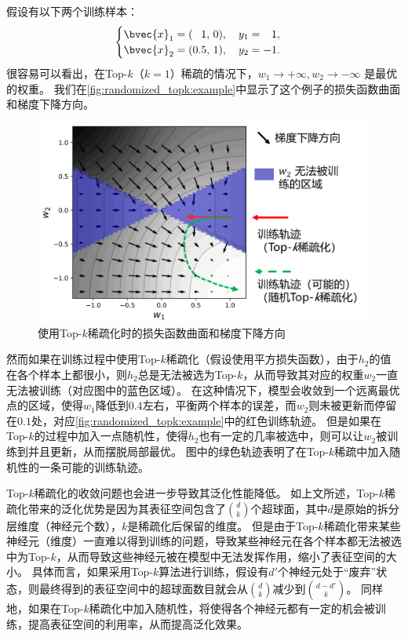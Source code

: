 假设有以下两个训练样本：
\begin{equation}
\begin{cases}
    \bvec{x}_1 = (\phantom{0.}1, \, 0), \quad y_1 = \phantom{-}1, \\
    \bvec{x}_2 = (          0.5, \, 1), \quad y_2 = -1.
\end{cases}
\end{equation}
%
很容易可以看出，在Top-$k$（$k=1$）稀疏的情况下，$w_1 \to +\infty, w_2 \to -\infty$ 是最优的权重。
%
我们在\autoref{fig:randomized_topk:example}中显示了这个例子的损失函数曲面和梯度下降方向。


\begin{figure}[htbp]
    \centering
    \includegraphics[width=0.75\linewidth]{Z_Resources/randtopk_example.png}
    \caption{使用Top-$k$稀疏化时的损失函数曲面和梯度下降方向}
    \label{fig:randomized_topk:example}
\end{figure}



然而如果在训练过程中使用Top-$k$稀疏化（假设使用平方损失函数），由于$h_2$的值在各个样本上都很小，则$h_2$总是无法被选为Top-$k$，从而导致其对应的权重$w_2$一直无法被训练（对应图中的蓝色区域）。
%
在这种情况下，模型会收敛到一个远离最优点的区域，使得$w_1$降低到$0.4$左右，平衡两个样本的误差，而$w_2$则未被更新而停留在$0.1$处，对应\autoref{fig:randomized_topk:example}中的红色训练轨迹。
%
但是如果在Top-$k$的过程中加入一点随机性，使得$h_2$也有一定的几率被选中，则可以让$w_2$被训练到并且更新，从而摆脱局部最优。
图中的绿色轨迹表明了在Top-$k$稀疏中加入随机性的一条可能的训练轨迹。


Top-$k$稀疏化的收敛问题也会进一步导致其泛化性能降低。
%
如上文所述，Top-$k$稀疏化带来的泛化优势是因为其表征空间包含了$d \choose k$个超球面，其中$d$是原始的拆分层维度（神经元个数），$k$是稀疏化后保留的维度。
%
但是由于Top-$k$稀疏化带来某些神经元（维度）一直难以得到训练的问题，导致某些神经元在各个样本都无法被选中为Top-$k$，从而导致这些神经元被在模型中无法发挥作用，缩小了表征空间的大小。
%
具体而言，如果采用Top-$k$算法进行训练，假设有$d'$个神经元处于“废弃”状态，则最终得到的表征空间中的超球面数目就会从$d \choose k$减少到$d - d' \choose k$。
%
同样地，如果在Top-$k$稀疏化中加入随机性，将使得各个神经元都有一定的机会被训练，提高表征空间的利用率，从而提高泛化效果。


